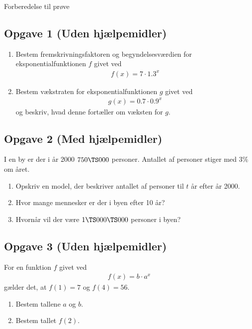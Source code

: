

\begin{center}
\Huge
Forberedelse til prøve	
\end{center}

\subsection*{Opgave 1 (Uden hjælpemidler)}

\begin{enumerate}[label=\roman*)]
	\item Bestem fremskrivningsfaktoren og begyndelsesværdien for eksponentialfunktionen $f$ givet ved
	\begin{align*}
		f(x) = 7\cdot 1.3^x
	\end{align*}
	\item Bestem vækstraten for eksponentialfunktionen $g$ givet ved
	\begin{align*}
		g(x) = 0.7\cdot 0.9^x
	\end{align*}
	og beskriv, hvad denne fortæller om væksten for $g$. 
\end{enumerate}


\subsection*{Opgave 2 (Med hjælpemidler)}

I en by er der i år 2000 $750\TS 000$ personer. Antallet af personer stiger med 3$\%$ om året.
\begin{enumerate}[label = \roman*)]
	\item Opskriv en model, der beskriver antallet af personer til $t$ år efter år 2000.
	\item Hvor mange mennesker er der i byen efter 10 år?
	\item Hvornår vil der være $1\TS 000\TS 000$ personer i byen?
\end{enumerate}

\subsection*{Opgave 3 (Uden hjælpemidler)}

For en funktion $f$ givet ved 
\begin{align*}
	f(x) = b\cdot a^x
\end{align*}
gælder det, at $f(1) = 7$ og $f(4) = 56$.
\begin{enumerate}[label=\roman*)]
	\item Bestem tallene $a$ og $b$. 
	\item Bestem tallet $f(2)$.
\end{enumerate}

